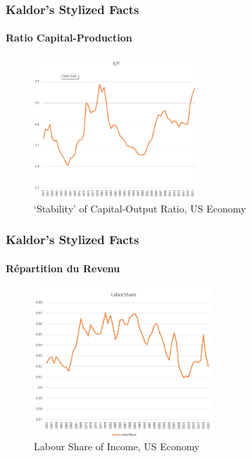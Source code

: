\documentclass{beamer}
\begin{document}
\begin{frame}
    \frametitle{Kaldor's Stylized Facts}
    \hypertarget{capital_output_ratio}{} %
    \framesubtitle{Ratio Capital-Production}
        \begin{figure}
            \centering
            \includegraphics[width=0.55\textwidth]{graphs/kyratio_usa.png}
            \caption{\enquote*{Stability} of Capital-Output Ratio, US Economy
            \hyperlink{augmented_solow}{}}
        \end{figure}
        
\end{frame}


\begin{frame}
    \frametitle{Kaldor's Stylized Facts}
    \hypertarget{income}{} %
    \framesubtitle{Répartition du Revenu}
        \begin{figure}
            \centering
            \includegraphics[width=0.6\textwidth]{graphs/labor_share.png}
            \caption{Labour Share of Income, US Economy
            \hyperlink{augmented_solow}{}}
        \end{figure}
\end{frame}
\end{document}
